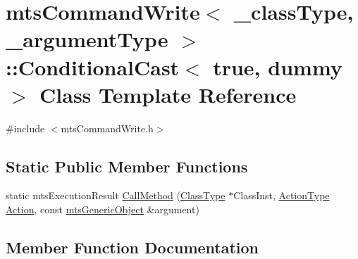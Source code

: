 \hypertarget{classmts_command_write_1_1_conditional_cast_3_01true_00_01dummy_01_4}{}\section{mts\+Command\+Write$<$ \+\_\+class\+Type, \+\_\+argument\+Type $>$\+:\+:Conditional\+Cast$<$ true, dummy $>$ Class Template Reference}
\label{classmts_command_write_1_1_conditional_cast_3_01true_00_01dummy_01_4}


{\ttfamily \#include $<$mts\+Command\+Write.\+h$>$}

\subsection*{Static Public Member Functions}
\begin{DoxyCompactItemize}
\item 
static mts\+Execution\+Result \hyperlink{classmts_command_write_1_1_conditional_cast_3_01true_00_01dummy_01_4_a266e6d67fbb7171a9234653dbee9cd72}{Call\+Method} (\hyperlink{classmts_command_write_aeccc8c434133c4adae34916b42ad493c}{Class\+Type} $\ast$Class\+Inst, \hyperlink{classmts_command_write_adb59c0a9491a687d96877bb27516b0e7}{Action\+Type} \hyperlink{classmts_command_write_affee375369797c3ffb3aba6578d33b23}{Action}, const \hyperlink{classmts_generic_object}{mts\+Generic\+Object} \&argument)
\end{DoxyCompactItemize}


\subsection{Member Function Documentation}
\hypertarget{classmts_command_write_1_1_conditional_cast_3_01true_00_01dummy_01_4_a266e6d67fbb7171a9234653dbee9cd72}{}
